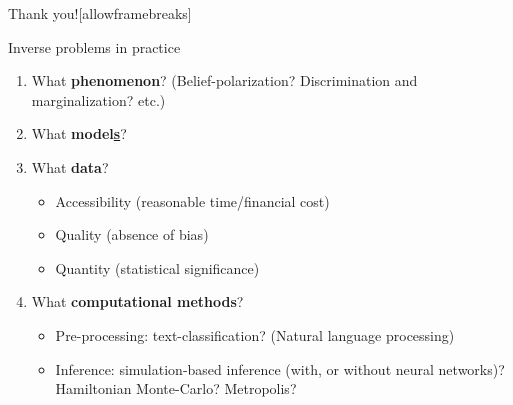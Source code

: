 \documentclass[10pt]{beamer}
\begin{document}
\begin{frame}{Thank you!}[allowframebreaks]
    \nocite{Cranmer2020,radev2021amortized}
    \printbibliography[heading=none]
\end{frame}

\begin{frame}{Inverse problems in practice}
\begin{enumerate}
    \item What \textbf{phenomenon}? (Belief-polarization? Discrimination and marginalization? etc.)
    \item What \textbf{model\underline{s}}? 
    \item What \textbf{data}?
    \begin{itemize}
        \item Accessibility (reasonable time/financial cost)
        \item Quality (absence of bias)
        \item Quantity (statistical significance)
    \end{itemize}
    \item What \textbf{computational methods}?
    \begin{itemize}
        \item Pre-processing: text-classification? (Natural language processing)
        \item Inference: simulation-based inference (with, or without neural networks)? Hamiltonian Monte-Carlo? Metropolis?
    \end{itemize}
\end{enumerate}
\end{frame}
\end{document}
